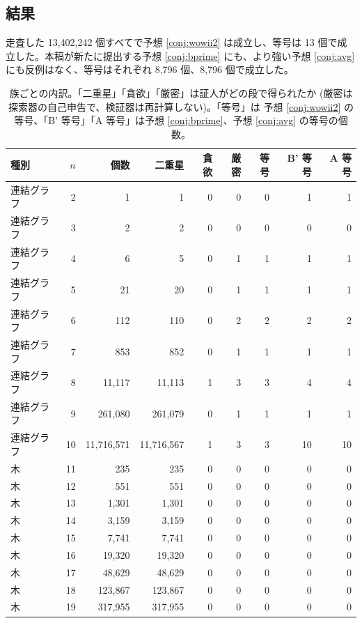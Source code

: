 \documentclass[paper=a4,fontsize=10.5pt,jafontsize=10.5pt]{jlreq}
\theoremstyle{plain}
\theoremstyle{definition}
\begin{document}
\subsection*{結果}

走査した 13,402,242 個すべてで予想 \ref{conj:wowii2} は成立し、等号は 13 個で成立した。本稿が新たに提出する予想 \ref{conj:bprime} にも、より強い予想 \ref{conj:avg} にも反例はなく、等号はそれぞれ 8,796 個、8,796 個で成立した。

\begin{table}[t]
\centering
\caption{族ごとの内訳。「二重星」「貪欲」「厳密」は証人がどの段で得られたか
(厳密は探索器の自己申告で、検証器は再計算しない)。「等号」は
予想 \ref{conj:wowii2} の等号、「B' 等号」「A 等号」は予想
\ref{conj:bprime}、予想 \ref{conj:avg} の等号の個数。}\label{tab:fams}
\begin{tabular}{lrrrrrrrr}
\toprule
種別 & $n$ & 個数 & 二重星 & 貪欲 & 厳密 & 等号 & B' 等号 & A 等号 \\
\midrule
連結グラフ & 2 & 1 & 1 & 0 & 0 & 0 & 1 & 1 \\
連結グラフ & 3 & 2 & 2 & 0 & 0 & 0 & 0 & 0 \\
連結グラフ & 4 & 6 & 5 & 0 & 1 & 1 & 1 & 1 \\
連結グラフ & 5 & 21 & 20 & 0 & 1 & 1 & 1 & 1 \\
連結グラフ & 6 & 112 & 110 & 0 & 2 & 2 & 2 & 2 \\
連結グラフ & 7 & 853 & 852 & 0 & 1 & 1 & 1 & 1 \\
連結グラフ & 8 & 11,117 & 11,113 & 1 & 3 & 3 & 4 & 4 \\
連結グラフ & 9 & 261,080 & 261,079 & 0 & 1 & 1 & 1 & 1 \\
連結グラフ & 10 & 11,716,571 & 11,716,567 & 1 & 3 & 3 & 10 & 10 \\
木 & 11 & 235 & 235 & 0 & 0 & 0 & 0 & 0 \\
木 & 12 & 551 & 551 & 0 & 0 & 0 & 0 & 0 \\
木 & 13 & 1,301 & 1,301 & 0 & 0 & 0 & 0 & 0 \\
木 & 14 & 3,159 & 3,159 & 0 & 0 & 0 & 0 & 0 \\
木 & 15 & 7,741 & 7,741 & 0 & 0 & 0 & 0 & 0 \\
木 & 16 & 19,320 & 19,320 & 0 & 0 & 0 & 0 & 0 \\
木 & 17 & 48,629 & 48,629 & 0 & 0 & 0 & 0 & 0 \\
木 & 18 & 123,867 & 123,867 & 0 & 0 & 0 & 0 & 0 \\
木 & 19 & 317,955 & 317,955 & 0 & 0 & 0 & 0 & 0 \\

\end{tabular}
\end{table}
\end{document}
